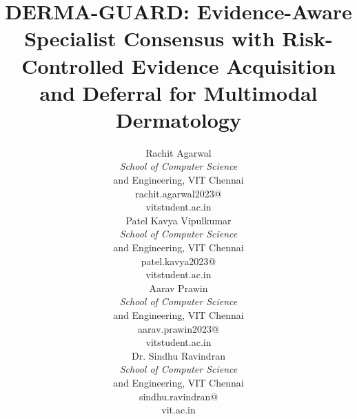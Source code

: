 \documentclass[conference]{IEEEtran}
\begin{document}
\title{DERMA-GUARD: Evidence-Aware Specialist Consensus with Risk-Controlled Evidence Acquisition and Deferral for Multimodal Dermatology}

\author{%
\parbox[t]{0.245\textwidth}{\centering
{\normalsize Rachit Agarwal\par}\vspace{2pt}
{\footnotesize\itshape School of Computer Science\par and Engineering, VIT Chennai\par}\vspace{1pt}
{\scriptsize rachit.agarwal2023@\par vitstudent.ac.in\par}}%
\hfill
\parbox[t]{0.245\textwidth}{\centering
{\normalsize Patel Kavya Vipulkumar\par}\vspace{2pt}
{\footnotesize\itshape School of Computer Science\par and Engineering, VIT Chennai\par}\vspace{1pt}
{\scriptsize patel.kavya2023@\par vitstudent.ac.in\par}}%
\hfill
\parbox[t]{0.245\textwidth}{\centering
{\normalsize Aarav Prawin\par}\vspace{2pt}
{\footnotesize\itshape School of Computer Science\par and Engineering, VIT Chennai\par}\vspace{1pt}
{\scriptsize aarav.prawin2023@\par vitstudent.ac.in\par}}%
\hfill
\parbox[t]{0.245\textwidth}{\centering
{\normalsize Dr. Sindhu Ravindran\par}\vspace{2pt}
{\footnotesize\itshape School of Computer Science\par and Engineering, VIT Chennai\par}\vspace{1pt}
{\scriptsize sindhu.ravindran@\par vit.ac.in\par}}%
}

\maketitle
\end{document}
